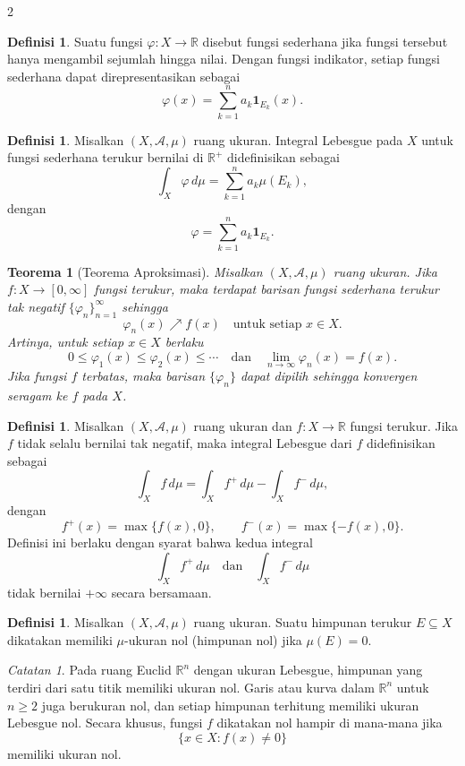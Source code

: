 \documentclass[a4paper,extrafontsizes, 9pt]{memoir}
\theoremstyle{definition}
\newtheorem{definisi}[kalstok]{Definisi}
\theoremstyle{plain}
\newtheorem{teorema}[kalstok]{Teorema}
\theoremstyle{remark}
\newtheorem{catatan}[kalstok]{Catatan}
\begin{document}
\begin{multicols}{2}
  \begin{definisi}
    Suatu fungsi $\varphi:X\to\mathbb{R}$ disebut fungsi sederhana jika fungsi tersebut hanya mengambil
    sejumlah hingga nilai. Dengan fungsi indikator, setiap fungsi sederhana dapat direpresentasikan sebagai
    \[\varphi(x)=\sum_{k=1}^{n}a_k\mathbf{1}_{E_k}(x).\]
  \end{definisi}

  \begin{definisi}
    Misalkan $(X,\mathcal{A},\mu)$ ruang ukuran. Integral Lebesgue pada $X$ untuk fungsi sederhana terukur
    bernilai di $\mathbb{R}^{+}$ didefinisikan sebagai
    \[\int_X\varphi\,d\mu=\sum_{k=1}^{n}a_k\mu(E_k),\]
    dengan
    \[\varphi=\sum_{k=1}^{n}a_k\mathbf{1}_{E_k}.\]
  \end{definisi}

  \begin{teorema}[Teorema Aproksimasi]
    Misalkan $(X,\mathcal{A},\mu)$ ruang ukuran. Jika $f:X\to[0,\infty]$ fungsi terukur,
    maka terdapat barisan fungsi sederhana terukur tak negatif $\{\varphi_n\}_{n=1}^{\infty}$ sehingga
    \[\varphi_n(x)\nearrow f(x)\quad\text{untuk setiap }x\in X.\]
    Artinya, untuk setiap $x\in X$ berlaku
    \[0\le\varphi_1(x)\le\varphi_2(x)\le\cdots\quad\text{dan}\quad\lim_{n\to\infty}\varphi_n(x)=f(x).\]
    Jika fungsi $f$ terbatas, maka barisan $\{\varphi_n\}$ dapat dipilih sehingga konvergen seragam ke $f$ pada $X$.
  \end{teorema}

  \begin{definisi}
    Misalkan $(X,\mathcal{A},\mu)$ ruang ukuran dan $f:X\to\mathbb{R}$ fungsi terukur.
    Jika $f$ tidak selalu bernilai tak negatif, maka integral Lebesgue dari $f$ didefinisikan sebagai
    \[\int_X f\,d\mu=\int_X f^{+}\,d\mu-\int_X f^{-}\,d\mu,\]
    dengan
    \[f^{+}(x)=\max\{f(x),0\},\qquad f^{-}(x)=\max\{-f(x),0\}.\]
    Definisi ini berlaku dengan syarat bahwa kedua integral
    \[\int_X f^{+}\,d\mu\quad\text{dan}\quad\int_X f^{-}\,d\mu\]
    tidak bernilai $+\infty$ secara bersamaan.
  \end{definisi}

  \begin{definisi}
    Misalkan $(X,\mathcal{A},\mu)$ ruang ukuran. Suatu himpunan terukur $E\subseteq X$ dikatakan
    memiliki $\mu$-ukuran nol (himpunan nol) jika
    $\mu(E)=0.$
  \end{definisi}

  \begin{catatan}
    Pada ruang Euclid $\mathbb{R}^{n}$ dengan ukuran Lebesgue, himpunan yang terdiri dari satu titik memiliki ukuran nol.
    Garis atau kurva dalam $\mathbb{R}^{n}$ untuk $n\ge 2$ juga berukuran nol, dan setiap himpunan terhitung memiliki
    ukuran Lebesgue nol. Secara khusus, fungsi $f$ dikatakan nol hampir di mana-mana jika
    \[\{x\in X:f(x)\neq 0\}\]
    memiliki ukuran nol.
  \end{catatan}


\end{multicols}
\end{document}
